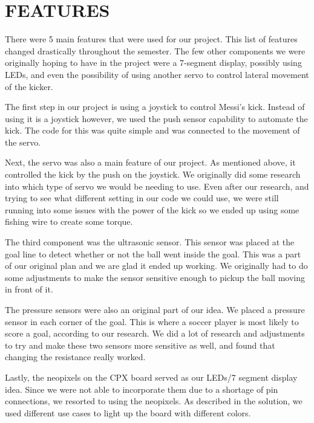 \documentclass[12pt]{article}
\begin{document}
\section{FEATURES}
There were 5 main features that were used for our project. This list of features changed drastically throughout the semester. The few other components we were originally hoping to have in the project were a 7-segment display, possibly using LEDs, and even the possibility of using another servo to control lateral movement of the kicker. 

The first step in our project is using a joystick to control Messi's kick. Instead of using it is a joystick however, we used the push sensor capability to automate the kick. The code for this was quite simple and was connected to the movement of the servo. 

Next, the servo was also a main feature of our project. As mentioned above, it controlled the kick by the push on the joystick. We originally did some research into which type of servo we would be needing to use. Even after our research, and trying to see what different setting in our code we could use, we were still running into some issues with the power of the kick so we ended up using some fishing wire to create some torque. 

The third component was the ultrasonic sensor. This sensor was placed at the goal line to detect whether or not the ball went inside the goal. This was a part of our original plan and we are glad it ended up working. We originally had to do some adjustments to make the sensor sensitive enough to pickup the ball moving in front of it. 

The pressure sensors were also an original part of our idea. We placed a pressure sensor in each corner of the goal. This is where a soccer player is most likely to score a goal, according to our research. We did a lot of research and adjustments to try and make these two sensors more sensitive as well, and found that changing the resistance really worked. 

Lastly, the neopixels on the CPX board served as our LEDs/7 segment display idea. Since we were not able to incorporate them due to a shortage of pin connections, we resorted to using the neopixels. As described in the solution, we used different use cases to light up the board with different colors. 
\end{document}
